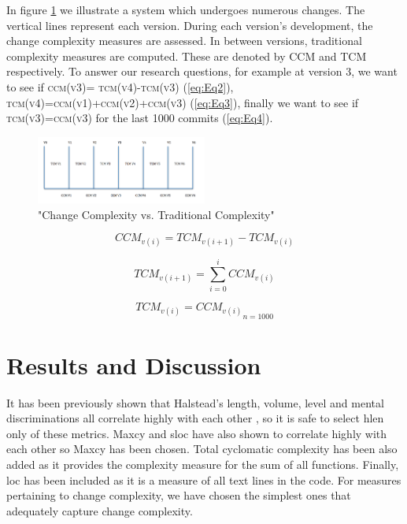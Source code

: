 \documentclass[9pt,twocolumn,a4paper]{article}
\begin{document}
In figure \ref{fig:ccVstc} we illustrate a system which undergoes numerous changes. The vertical lines represent each version. During each version's development, the change complexity measures are assessed. In between versions, traditional complexity measures are computed. These are denoted by CCM and TCM respectively. To answer our research questions, for example at version 3, we want to see if \textsc{ ccm(v3)= tcm(v4)-tcm(v3)} (\ref{eq:Eq2}), \textsc {tcm(v4)=ccm(v1)+ccm(v2)+ccm(v3)
} (\ref{eq:Eq3}), finally we want to see if \textsc {tcm(v3)=ccm(v3)} for the last 1000 commits (\ref{eq:Eq4}).

\begin{figure}[h!]
  \centering
  \includegraphics[width=0.5\textwidth]{change_complexity_figure}
   \caption{"Change Complexity vs. Traditional Complexity"}
   \label{fig:ccVstc}
\end{figure}



\begin{equation} \label{eq:Eq2}
{{CCM_{v(i)}} = {TCM_{v(i+1)}}-{TCM_{v(i)}}}
\end{equation}

\begin{equation} \label{eq:Eq3}
{{TCM_{v(i+1)}} = \sum\limits_{i=0}^iCCM_{v(i)}}
\end{equation}
 
\begin{equation}  \label{eq:Eq4}
{{{TCM_{v(i)}} = CCM_{v(i)}}   _{n=1000}}
\end{equation}

\section{Results and Discussion}

It has been previously shown that Halstead's length, volume, level and mental discriminations all correlate highly with each other \cite{Israel}, so it is safe to select hlen only of these metrics. Maxcy and sloc have also shown to correlate highly with each other so Maxcy has been chosen. Total cyclomatic complexity has been also added as it provides the complexity measure for the sum of all functions. Finally, loc has been included as it is a measure of all text lines in the code. For measures pertaining to change complexity, we have chosen the simplest ones that adequately capture change complexity. 
\newline
\end{document}

